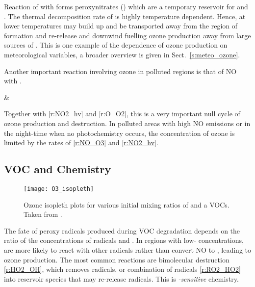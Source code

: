 Reaction of  with  forms peroxynitrates () which are a temporary reservoir for  and .
The thermal decomposition rate of  is highly temperature dependent.
Hence, at lower temperatures  may build up and be transported away from the region of formation and re-release  and  downwind fuelling ozone production away from large sources of .
This is one example of the dependence of ozone production on meteorological variables, a broader overview is given in Sect.~\ref{s:meteo_ozone}.


Another important reaction involving ozone in polluted regions is that of NO with .
\begin{rxnarray}
     & \rightarrow {} \label{r:NO_O3}
\end{rxnarray}
Together with \eqref{r:NO2_hv} and \eqref{r:O_O2}, this is a very important null cycle of ozone production and destruction.
In polluted areas with high NO emissions or in the night-time when no photochemistry occurs, the concentration of ozone is limited by the rates of \eqref{r:NO_O3} and \eqref{r:NO2_hv}.

\subsection[VOC and NOx Chemistry]{VOC and  Chemistry} \label{ss:VOC_NOx}
\begin{figure}
	\begin{center}
        \caption[Ozone mixing ratios as a function of  and VOC]{Ozone isopleth plots for various initial mixing ratios of  and a VOCs. Taken from \citet{Jenkin:2000}.}
        \texttt{[image: O3\_isopleth]}
		\label{f:O3_isopleth}
	\end{center}
\end{figure}
The fate of peroxy radicals produced during VOC degradation depends on the ratio of the concentrations of radicals and  \citep{Kleinman:1991, Kleinman:1994}.
In regions with low- concentrations,  are more likely to react with other radicals rather than convert NO to , leading to ozone production.
The most common reactions are bimolecular destruction \eqref{r:HO2_OH}, which removes radicals, or combination of radicals \eqref{r:RO2_HO2} into reservoir species that may re-release radicals.
This is \emph{-sensitive} chemistry.

